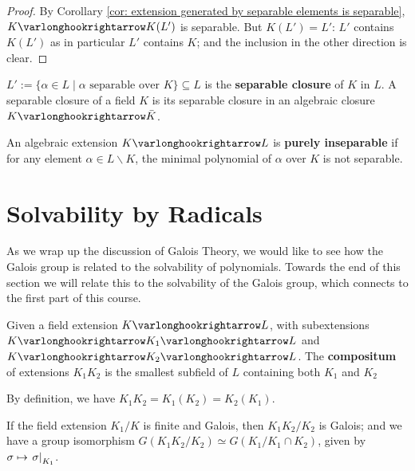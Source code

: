 \documentclass{article}
\begin{document}
\begin{proof}
    By Corollary \ref{cor: extension generated by separable elements is separable}, $K \ext K(L')$ is separable. But $K(L') = L'$: $L'$ contains $K(L')$ as in particular $L'$ contains $K$; and the inclusion in the other direction is clear.
\end{proof}

\begin{definition}
    $L' := \{ \alpha \in L \mid \alpha \text{ separable over $K$}\} \subseteq L$ is the \textbf{separable closure} of $K$ in $L$. A separable closure of a field $K$ is its separable closure in an algebraic closure $K \ext \bar{K}$.
\end{definition}
\nogap
\begin{definition}
    An algebraic extension $K \ext L$ is \textbf{purely inseparable} if for any element $\alpha \in L \smallsetminus K$, the minimal polynomial of $\alpha$ over $K$ is not separable. 
\end{definition}

\section{Solvability by Radicals}

\textstart
As we wrap up the discussion of Galois Theory, we would like to see how the Galois group is related to the solvability of polynomials. Towards the end of this section we will relate this to the solvability of the Galois group, which connects to the first part of this course.

\begin{definition}[Compositum]
    Given a field extension $K \ext L$, with subextensions $K \ext K_1 \ext L$ and $K \ext K_2 \ext L$. The \textbf{compositum} of extensions $K_1K_2$ is the smallest subfield of $L$ containing both $K_1$ and $K_2$
\end{definition}

\begin{remark}
    By definition, we have $K_1 K_2 = K_1(K_2) = K_2(K_1)$.
\end{remark}

\begin{proposition}
    If the field extension $K_1/K$ is finite and Galois, then $K_1 K_2/K_2$ is Galois; and we have a group isomorphism $G(K_1K_2/K_2) \simeq G(K_1/K_1\cap K_2)$, given by $\sigma \mapsto \left.\sigma\right|_{K_1}$.
\end{proposition}
\end{document}
